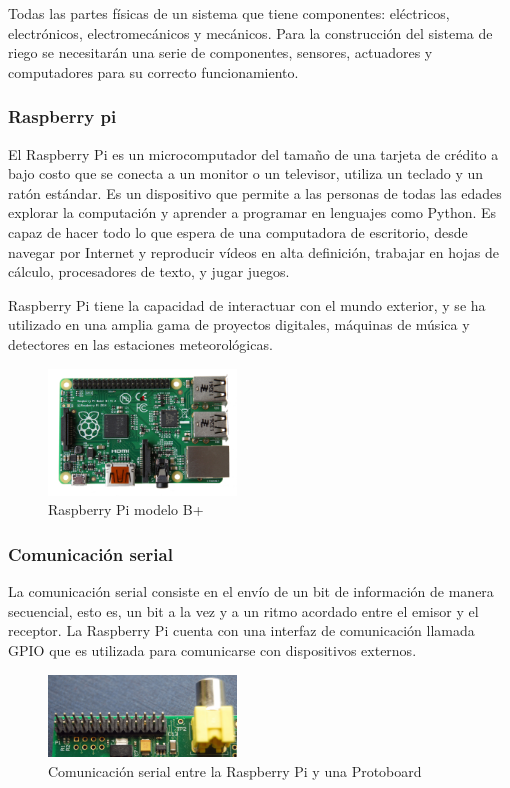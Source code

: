 \documentclass[11pt,letterpaper]{article}
\begin{document}
Todas las partes físicas de un sistema que tiene componentes: eléctricos, electrónicos, electromecánicos y mecánicos. Para la construcción del sistema de riego se necesitarán una serie de componentes, sensores, actuadores y computadores para su correcto funcionamiento.

\subsubsection{Raspberry pi}

El Raspberry Pi es un microcomputador del tamaño de una tarjeta de crédito a bajo costo que se conecta a un monitor o un televisor, utiliza un teclado y un ratón estándar. Es un dispositivo que permite a las personas de todas las edades explorar la computación y aprender a programar en lenguajes como Python. Es capaz de hacer todo lo que espera de una computadora de escritorio, desde navegar por Internet y reproducir vídeos en alta definición, trabajar en hojas de cálculo, procesadores de texto, y jugar juegos.

Raspberry Pi tiene la capacidad de interactuar con el mundo exterior, y se ha utilizado en una amplia gama de proyectos digitales, máquinas de música y detectores en las estaciones meteorológicas.\citep{raspberry}

\begin{figure}[ht!]
\caption{Raspberry Pi modelo B+}
\centering
\includegraphics[width=5cm]{rasp}
\end{figure}

\newpage

\subsubsection{Comunicación serial}

La comunicación serial consiste en el envío de un bit de información de manera
secuencial, esto es, un bit a la vez y a un ritmo acordado entre el emisor y el receptor.
La Raspberry Pi cuenta con una interfaz de comunicación llamada GPIO que es utilizada para comunicarse con dispositivos externos.

\begin{figure}[ht!]
\caption{Comunicación serial entre la Raspberry Pi y una Protoboard}
\centering
\includegraphics[width=5cm]{gpio}
\end{figure}
\end{document}
